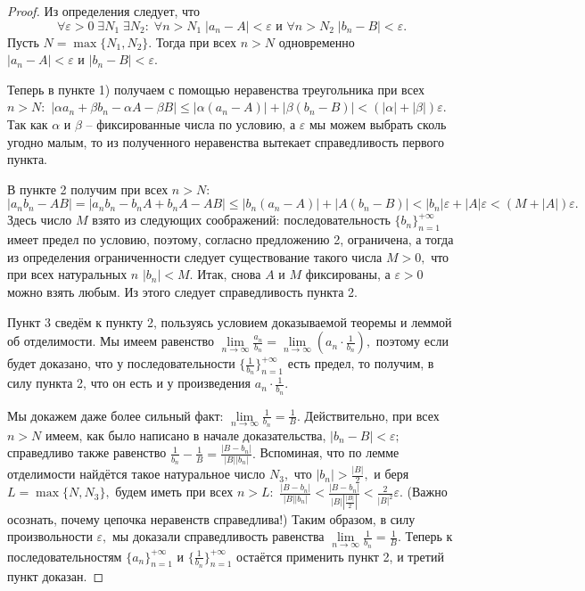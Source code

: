 \begin{proof}
    Из определения следует, что $$\forall\varepsilon>0
        \;\exists N_1\;\exists N_2:\;
        \forall n>N_1\;|a_n-A|<\varepsilon \textrm{ и }
        \forall n>N_2\;|b_n-B|<\varepsilon.$$
    Пусть $N=\max\{N_1, N_2\}.$
    Тогда при всех $n>N$ одновременно
    $|a_n-A|<\varepsilon \textrm{ и } |b_n-B|<\varepsilon.$

    Теперь в пункте 1) получаем
    с помощью неравенства
    треугольника при всех $n>N:$
    $|\alpha a_n+\beta b_n-\alpha A-\beta B|
        \leq|\alpha(a_n-A)|+|\beta(b_n-B)|<
        (|\alpha|+|\beta|)\varepsilon.$ Так как
    $\alpha$ и $\beta$ -- фиксированные числа
    по условию, а $\varepsilon$ мы можем
    выбрать сколь угодно малым, то из
    полученного неравенства вытекает
    справедливость первого пункта.

    В пункте 2 получим при всех
    $n>N$: $$|a_nb_n-AB|=|a_nb_n-b_nA+b_nA-AB|\leq
        |b_n(a_n-A)|+|A(b_n-B)|<|b_n|\varepsilon+
        |A|\varepsilon<(M+|A|)\varepsilon.$$
    Здесь число $M$ взято из следующих
    соображений: последовательность
    $\{b_n\}_{n=1}^{+\infty}$ имеет
    предел по условию, поэтому, согласно
    предложению 2, ограничена, а тогда из
    определения ограниченности следует существование
    такого числа $M>0,$ что при всех
    натуральных $n$ $|b_n|<M.$
    Итак, снова $A$ и $M$ фиксированы,
    а $\varepsilon>0$ можно взять
    любым. Из этого следует справедливость
    пункта 2.

    Пункт 3 сведём к пункту 2, пользуясь условием доказываемой
    теоремы
    и леммой об отделимости.
    Мы имеем равенство
    $\lim\limits_{n\rightarrow\infty}\frac{a_n}{b_n}=
        \lim\limits_{n\rightarrow\infty}\left(a_n\cdot
        \frac{1}{b_n}\right),$ поэтому если будет доказано,
    что у последовательности
    $\{\frac{1}{b_n}\}_{n=1}^{+\infty}$ есть предел,
    то получим, в силу пункта 2, что он есть
    и у произведения $a_n\cdot
        \frac{1}{b_n}.$

    Мы докажем даже более
    сильный факт:
    $\lim\limits_{n\rightarrow\infty}\frac{1}{b_n}=
        \frac{1}{B}.$ Действительно, при всех $n>N$ имеем, как
    было написано в начале доказательства, $|b_n-B|<\varepsilon;$
    справедливо также равенство
    $\frac{1}{b_n}-\frac{1}{B}=\frac{|B-b_n|}{|B||b_n|}.$
    Вспоминая, что по лемме отделимости найдётся такое
    натуральное число $N_3,$ что $|b_n|>\frac{|B|}{2},$
    и беря $L=\max\{N, N_3\},$ будем иметь при всех $n>L:$
    $\frac{|B-b_n|}{|B||b_n|}<\frac{|B-b_n|}{|B||
            \frac{|B|}{2}|}<\frac{2}{|B|^2}\varepsilon.$
    (Важно осознать, почему цепочка неравенств
    справедлива!) Таким образом, в силу произвольности
    $\varepsilon,$ мы доказали справедливость
    равенства $\lim\limits_{n\rightarrow\infty}\frac{1}{b_n}=
        \frac{1}{B}.$ Теперь к последовательностям
    $\{a_n\}_{n=1}^{+\infty}$ и $\{\frac{1}{b_n}\}_{n=1}^{+\infty}$
    остаётся применить пункт 2, и третий пункт доказан.
\end{proof}

